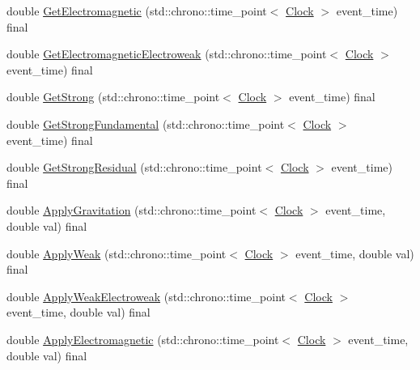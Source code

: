 \begin{DoxyCompactItemize}
\item 
double \mbox{\hyperlink{classDimension_a21783c29a576518b722512f1245fa598}{Get\+Electromagnetic}} (std\+::chrono\+::time\+\_\+point$<$ \mbox{\hyperlink{universe_8h_a0ef8d951d1ca5ab3cfaf7ab4c7a6fd80}{Clock}} $>$ event\+\_\+time) final
\item 
double \mbox{\hyperlink{classDimension_ae1babb1fa280c35966d7ee3de6655e4d}{Get\+Electromagnetic\+Electroweak}} (std\+::chrono\+::time\+\_\+point$<$ \mbox{\hyperlink{universe_8h_a0ef8d951d1ca5ab3cfaf7ab4c7a6fd80}{Clock}} $>$ event\+\_\+time) final
\item 
double \mbox{\hyperlink{classDimension_ae36aadad4ae84735a5ff73bff4eb97b1}{Get\+Strong}} (std\+::chrono\+::time\+\_\+point$<$ \mbox{\hyperlink{universe_8h_a0ef8d951d1ca5ab3cfaf7ab4c7a6fd80}{Clock}} $>$ event\+\_\+time) final
\item 
double \mbox{\hyperlink{classDimension_ad0d067d7f9dc4841b0ad280979ebe7af}{Get\+Strong\+Fundamental}} (std\+::chrono\+::time\+\_\+point$<$ \mbox{\hyperlink{universe_8h_a0ef8d951d1ca5ab3cfaf7ab4c7a6fd80}{Clock}} $>$ event\+\_\+time) final
\item 
double \mbox{\hyperlink{classDimension_aeee6025f17d9cd1bf7f324d715a30691}{Get\+Strong\+Residual}} (std\+::chrono\+::time\+\_\+point$<$ \mbox{\hyperlink{universe_8h_a0ef8d951d1ca5ab3cfaf7ab4c7a6fd80}{Clock}} $>$ event\+\_\+time) final
\item 
double \mbox{\hyperlink{classDimension_a9474b0dd3f6321a92bfe4375bb4b2266}{Apply\+Gravitation}} (std\+::chrono\+::time\+\_\+point$<$ \mbox{\hyperlink{universe_8h_a0ef8d951d1ca5ab3cfaf7ab4c7a6fd80}{Clock}} $>$ event\+\_\+time, double val) final
\item 
double \mbox{\hyperlink{classDimension_a72b8ab8d676b4df6b9a6ef948f5693c9}{Apply\+Weak}} (std\+::chrono\+::time\+\_\+point$<$ \mbox{\hyperlink{universe_8h_a0ef8d951d1ca5ab3cfaf7ab4c7a6fd80}{Clock}} $>$ event\+\_\+time, double val) final
\item 
double \mbox{\hyperlink{classDimension_abf490cabd486afa660f17940ed0d17e6}{Apply\+Weak\+Electroweak}} (std\+::chrono\+::time\+\_\+point$<$ \mbox{\hyperlink{universe_8h_a0ef8d951d1ca5ab3cfaf7ab4c7a6fd80}{Clock}} $>$ event\+\_\+time, double val) final
\item 
double \mbox{\hyperlink{classDimension_a65bcd3c09792cf53b1f614eff49cf111}{Apply\+Electromagnetic}} (std\+::chrono\+::time\+\_\+point$<$ \mbox{\hyperlink{universe_8h_a0ef8d951d1ca5ab3cfaf7ab4c7a6fd80}{Clock}} $>$ event\+\_\+time, double val) final
\item 

\end{DoxyCompactItemize}
